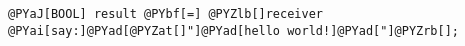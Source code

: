 \begin{Verbatim}[commandchars=@\[\]]
@PYaJ[BOOL] result @PYbf[=] @PYZlb[]receiver @PYai[say:]@PYad[@PYZat[]"]@PYad[hello world!]@PYad["]@PYZrb[];
\end{Verbatim}
